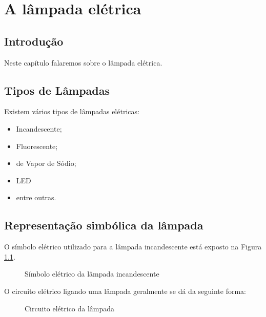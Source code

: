 \chapter{A lâmpada elétrica}
\label{chap:alampada}

\section{Introdução}

Neste capítulo falaremos sobre o lâmpada elétrica.

\section{Tipos de Lâmpadas}

Existem vários tipos de lâmpadas elétricas:
\begin{itemize}
\item Incandescente;
\item Fluorescente;
\item de Vapor de Sódio;
\item LED 
\item entre outras. %
\end{itemize}

\section{Representação simbólica da lâmpada}

O símbolo elétrico utilizado para a lâmpada incandescente está
exposto na Figura \ref{fig:simbolo_lampada}.

\begin{figure}[!htb]
\centering
{}
\caption{Símbolo elétrico da lâmpada incandescente}
\label{fig:simbolo_lampada}
\end{figure}

O circuito elétrico ligando uma lâmpada geralmente se dá da
seguinte forma:

\begin{figure}[!htb]
\centering
{}
\caption{Circuito elétrico da lâmpada}
\label{fig:circuito_lampada}
\end{figure}


